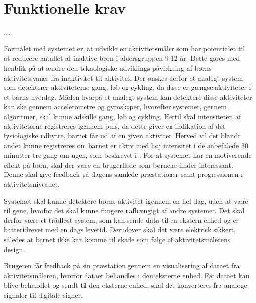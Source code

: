 \section{Funktionelle krav}
\textit{...}

Formålet med systemet er, at udvikle en aktivitetsmåler som har potentialet til at reducere antallet af inaktive børn i aldersgruppen 9-12 år. Dette gøres med henblik på at ændre den teknologiske udviklings påvirkning af børns aktivitetsvaner fra inaktivitet til aktivitet.
Der ønskes derfor et analogt system som detekterer aktiviteterne gang, løb og cykling, da disse er gængse aktiviteter i et barns hverdag. Måden hvorpå et analogt system kan detektere disse aktiviteter kan ske gennem accelerometre og gyroskoper, hvorefter systemet, gennem algoritmer, skal kunne adskille gang, løb og cykling.
Hertil skal intensiteten af aktiviteterne registreres igennem puls, da dette giver en indikation af det fysiologiske udbytte, barnet får ud af en given aktivitet. Herved vil det blandt andet kunne registreres om barnet er aktiv med høj intensitet i de anbefalede 30 minutter tre gang om ugen, som beskrevet i . \newline
For at systemet har en motiverende effekt på børn, skal der være en brugerflade som børnene finder interessant. Denne skal give feedback på dagens samlede præstationer samt progressionen i aktivitetsniveauet.

Systemet skal kunne detektere børns aktivitet igennem en hel dag, uden at være til gene, hvorfor det skal kunne fungere uafhængigt af andre systemer. Det skal derfor være et trådløst system, som kan sende data til en ekstern enhed og er batteridrevet med en dags levetid. Derudover skal det være elektrisk sikkert, således at barnet ikke kan komme til skade som følge af aktivitetsmålerens design. 

Brugeren får feedback på sin præstation gennem en visualisering af dataet fra aktivitetsmåleren, hvorfor dataet behandles i den eksterne enhed. \newline
Før dataet kan blive behandlet og sendt til den eksterne enhed, skal det konverteres fra analoge signaler til digitale signer. 

